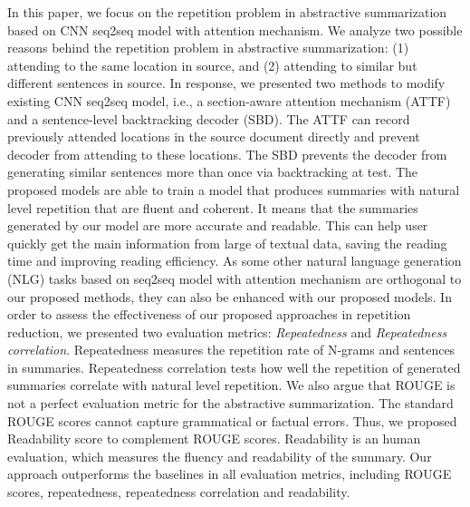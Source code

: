 \documentclass{nle}
\theoremstyle{definition}
\begin{document}
In this paper, we focus on the repetition problem in abstractive summarization based on CNN seq2seq model with attention mechanism.
We analyze two possible reasons behind the repetition problem in abstractive
summarization: (1) attending to the same location in source,
and (2) attending to similar but different sentences in source. 
In response, 
we presented two methods to modify existing CNN seq2seq model, i.e.,
a section-aware attention mechanism (ATTF)
and a sentence-level backtracking decoder (SBD). 
The ATTF can record previously attended locations in the source document directly 
and prevent decoder from attending to these locations. 
The SBD prevents the decoder from generating similar sentences more than once via backtracking at test.
The proposed models are able to train a model that produces 
summaries with natural level repetition that are fluent and coherent. 
It means that the summaries generated by our model are more accurate and 
readable. This can help user quickly get the main information from large of textual data,
saving the reading time and improving reading efficiency.
As some other natural language generation (NLG) tasks based on seq2seq model with attention mechanism
are orthogonal to our proposed methods,
they can also be enhanced with our proposed models.
In order to assess the effectiveness of our proposed approaches in repetition reduction, 
we presented two evaluation metrics: \textit{Repeatedness} and \textit{Repeatedness correlation}.
Repeatedness measures the repetition rate of N-grams and sentences in summaries. 
Repeatedness correlation tests how well the repetition of generated summaries 
correlate with natural level repetition.
We also argue that ROUGE is not a perfect evaluation metric for the abstractive 
summarization. The standard ROUGE scores cannot capture grammatical or factual errors.
Thus, we proposed Readability score to complement ROUGE scores.
Readability is an human evaluation, which measures the fluency and readability of the
summary. 
Our approach outperforms the baselines in 
all evaluation metrics, including ROUGE scores, repeatedness, 
repeatedness correlation and readability.




\label{lastpage}
\end{document}
